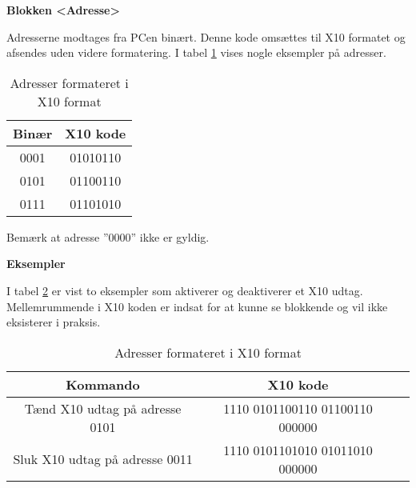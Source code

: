 \textbf{Blokken <Adresse>}

Adresserne modtages fra PCen binært. Denne kode omsættes til X10 formatet og afsendes uden videre formatering.
I tabel \ref{tabel:X10Adresser} vises nogle eksempler på adresser.

\begin{table}[h]
\caption{Adresser formateret i X10 format}
\centering
\begin{tabular}{|c|c|}
\hline 
\textbf{Binær} & \textbf{X10 kode} \\ 
\hline 
0001 & 01010110 \\ 
\hline 
0101 & 01100110 \\ 
\hline
0111 & 01101010 \\
\hline
\end{tabular}
\label{tabel:X10Adresser}
\end{table} 

Bemærk at adresse ''0000'' ikke er gyldig.

\textbf{Eksempler}

I tabel \ref{tabel:X10Eksempler} er vist to eksempler som aktiverer og deaktiverer et X10 udtag. Mellemrummende i X10 koden er indsat for at kunne se blokkende og vil ikke eksisterer i praksis.

\begin{table}[h]
\caption{Adresser formateret i X10 format}
\centering
\begin{tabular}{|c|c|c|}
\hline 
\textbf{Kommando} & \textbf{X10 kode} \\ 
\hline 
Tænd X10 udtag på adresse 0101 & 1110 0101100110 01100110 000000 \\ 
\hline 
Sluk X10 udtag på adresse 0011 & 1110 0101101010 01011010 000000 \\ 
\hline
\end{tabular}
\label{tabel:X10Eksempler}
\end{table} 
